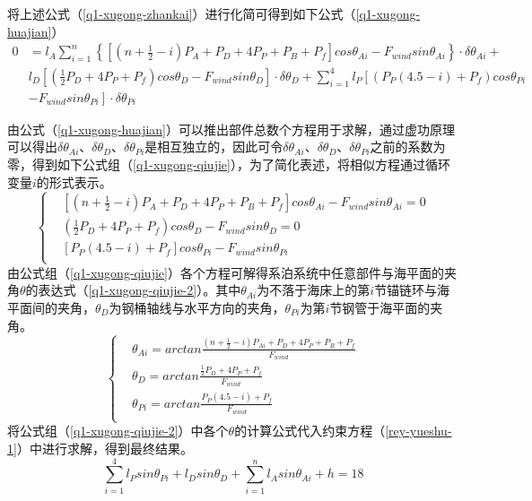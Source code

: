 \documentclass[withoutpreface,bwprint]{cumcmthesis} %
\begin{document}
\par 将上述公式（\ref{q1-xugong-zhankai}）进行化简可得到如下公式（\ref{q1-xugong-huajian}）
\begin{equation}
	\label{q1-xugong-huajian}
	\begin{split}
		0 &= l_A \sum\limits_{i=1}^{n} \left\{ { \left[(n+\frac{1}{2} - i)P_A +P_D +4P_P +P_B+P_f\right]cos \theta_{Ai} - F_{wind}sin\theta_{Ai} }\right\} \cdot \delta\theta_{Ai} + \\
		& l_D \left[ {(\frac{1}{2} P_D +4P_P+P_f)cos\theta_D - F_{wind}sin\theta_D }\right] \cdot \delta \theta_D  + \sum\limits_{i=1}^{4}l_P \left[ {(P_P(4.5-i)+P_f)cos\theta_{Pi}}\right.\\
		& \left. {-F_{wind} sin\theta_{Pi} }\right] \cdot \delta \theta_{Pi}
	\end{split}
\end{equation}
\par 由公式（\ref{q1-xugong-huajian}）可以推出部件总数个方程用于求解，通过虚功原理可以得出$\delta \theta_{Ai}$、$\delta \theta_{D}$、$\delta \theta_{Pi}$是相互独立的，因此可令$\delta \theta_{Ai}$、$\delta \theta_{D}$、$\delta \theta_{Pi}$之前的系数为零，得到如下公式组（\ref{q1-xugong-qiujie}），为了简化表述，将相似方程通过循环变量$i$的形式表示。
\begin{equation}
	\label{q1-xugong-qiujie}
	\left\{
	\begin{split}
		& \left[ (n + \frac{1}{2} - i)P_A +P_D+4P_P+P_B+P_f \right] cos\theta_{Ai} - F_{wind} sin\theta_{Ai} = 0\\
		& (\frac{1}{2} P_D+4P_P+P_f)cos\theta_D - F_{wind}sin\theta_{D} = 0\\
		& \left[ P_P(4.5-i)+P_f \right] cos\theta_{Pi} - F_{wind} sin \theta_{Pi}\\
	\end{split}
	\right.
\end{equation}
由公式组（\ref{q1-xugong-qiujie}）各个方程可解得系泊系统中任意部件与海平面的夹角$\theta$的表达式（\ref{q1-xugong-qiujie-2}）。其中$\theta_{Ai}$为不落于海床上的第$i$节锚链环与海平面间的夹角，$\theta_D$为钢桶轴线与水平方向的夹角，$\theta_{Pi}$为第$i$节钢管于海平面的夹角。
\begin{equation}
	\label{q1-xugong-qiujie-2}
	\left\{
	\begin{split}
		& \theta_{Ai} = arctan\frac{(n + \frac{1}{2} - i)P_{Ai} +P_D+4P_P+P_B+P_f}{F_{wind}} \\
		& \theta_D = arctan\frac{\frac{1}{2}P_D+4P_P+P_f}{F_{wind}}\\
		& \theta_{Pi} = arctan\frac{P_P(4.5-i)+P_f}{F_{wind}}\\
	\end{split}
	\right.
\end{equation}
将公式组（\ref{q1-xugong-qiujie-2}）中各个$\theta$的计算公式代入约束方程（\ref{rey-yueshu-1}）中进行求解，得到最终结果。
\begin{equation}
	\label{rey-yueshu-1}
	\sum\limits_{i=1}^{4} l_P sin \theta_{Pi} + l_D sin \theta_D + \sum\limits_{i=1}^{n} l_A sin \theta_{Ai} + h = 18
\end{equation}
\end{document}
